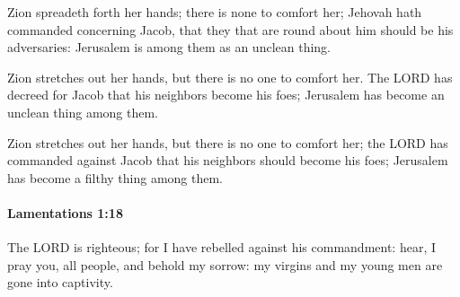 			\begin{versebox}
					\item[BHS] 
					\item[LXX] 
					\item[ASV] Zion spreadeth forth her hands; there is none to comfort her; Jehovah hath commanded concerning Jacob, that they that are round about him should be his adversaries: Jerusalem is among them as an unclean thing.
					\item[NIV] Zion stretches out her hands, but there is no one to comfort her. The LORD has decreed for Jacob that his neighbors become his foes; Jerusalem has become an unclean thing among them.
					\item[NRSV] Zion stretches out her hands, but there is no one to comfort her; the LORD has commanded against Jacob that his neighbors should become his foes; Jerusalem has become a filthy thing among them.
			\end{versebox}

		\paragraph{Lamentations 1:18} %
			\label{LAMENTATIONS-1-18}

			The LORD is righteous; for I have rebelled against his commandment: hear, I pray you, all people, and behold my sorrow: my virgins and my young men are gone into captivity.

